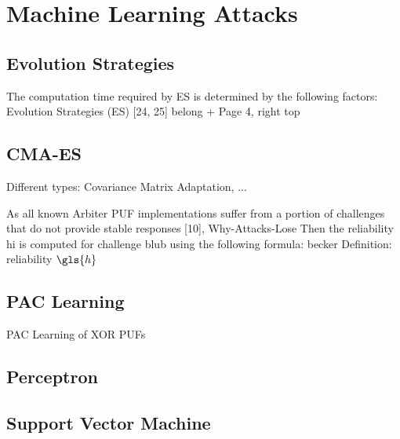 \chapter{Machine Learning Attacks}
\label{cap:mla}

\section{Evolution Strategies}
\label{sec:evolutionstrategies}

The computation time required by ES is determined by the following factors: \cite{Ruhrmair2013PUFData}
Evolution Strategies (ES) [24, 25] belong \cite{Ruhrmair2010ModelingFunctions} + Page 4, right top

\cite{Hansen2006TheReview}
\cite{Delvaux2013SideNoise}


\section{CMA-ES}
\label{sec:cma-es}
Different types: Covariance Matrix Adaptation, ...

\cite{Hansen2006TheReview}
\cite{Delvaux2013SideNoise}

As all known Arbiter PUF implementations suffer from a portion of challenges that do not provide stable responses [10], Why-Attacks-Lose
Then the reliability hi is computed for challenge blub using the following formula: becker
Definition: reliability $\gls{h}$ \cite{Becker2015ThePUFs}


\section{PAC Learning}
\label{PAC learning}

PAC Learning of XOR PUFs \cite{Ganji2015WhyPUFs}


\section{Perceptron}
\label{sec:perceptron}


\section{Support Vector Machine}
\label{sec:svm}

